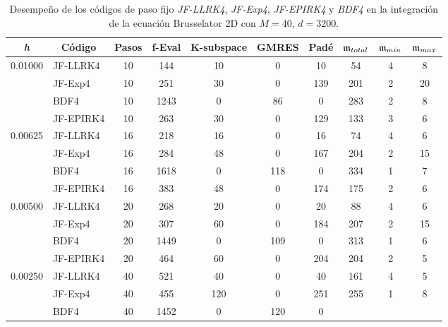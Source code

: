 \begin{table}[htb]
	\caption{Desempeño de los códigos de paso fijo \textit{JF-LLRK4}, \textit{JF-Exp4}, \textit{JF-EPIRK4} y \textit{BDF4} en la integración de la ecuación Brusselator 2D con $M=40$, $d=3200$.}
	\centering
	\begin{adjustbox}{width=0.9\columnwidth,center}
		\begin{tabular}{cccccccccc}
			\hline
			\textit{h} & Código & Pasos & f-Eval & K-subspace & GMRES & Padé & $\mathfrak{m}_{total}$ & $\mf%
			_{min}$ & $\mathfrak{m}_{max}$ \\ \hline
			\multicolumn{1}{l}{0.01000} & \multicolumn{1}{l}{JF-LLRK4} & 10 & 144 & 10
			& 0 & 10 & 54 & 4 & 8 \\
			\multicolumn{1}{l}{} & \multicolumn{1}{l}{JF-Exp4} & 10 & 251 & 30 & 0 & 139
			& 201 & 2 & 20 \\
			\multicolumn{1}{l}{} & \multicolumn{1}{l}{BDF4} & 10 & 1243 & 0 & 86 & 0 &
			283 & 2 & 8 \\
			\multicolumn{1}{l}{} & \multicolumn{1}{l}{JF-EPIRK4} & 10 & 263 & 30 & 0 &
			129 & 133 & 3 & 6 \\
			\multicolumn{1}{l}{0.00625} & \multicolumn{1}{l}{JF-LLRK4} & 16 & 218 & 16
			& 0 & 16 & 74 & 4 & 6 \\
			\multicolumn{1}{l}{} & \multicolumn{1}{l}{JF-Exp4} & 16 & 284 & 48 & 0 & 167
			& 204 & 2 & 15 \\
			\multicolumn{1}{l}{} & \multicolumn{1}{l}{BDF4} & 16 & 1618 & 0 & 118 & 0 &
			334 & 1 & 7 \\
			\multicolumn{1}{l}{} & \multicolumn{1}{l}{JF-EPIRK4} & 16 & 383 & 48 & 0 &
			174 & 175 & 2 & 6 \\
			\multicolumn{1}{l}{0.00500} & \multicolumn{1}{l}{JF-LLRK4} & 20 & 268 & 20 &
			0 & 20 & 88 & 4 & 6 \\
			\multicolumn{1}{l}{} & \multicolumn{1}{l}{JF-Exp4} & 20 & 307 & 60 & 0 & 184
			& 207 & 2 & 15 \\
			\multicolumn{1}{l}{} & \multicolumn{1}{l}{BDF4} & 20 & 1449 & 0 & 109 & 0 &
			313 & 1 & 6 \\
			\multicolumn{1}{l}{} & \multicolumn{1}{l}{JF-EPIRK4} & 20 & 464 & 60 & 0 &
			204 & 204 & 2 & 5 \\
			\multicolumn{1}{l}{0.00250} & \multicolumn{1}{l}{JF-LLRK4} & 40 & 521 & 40 &
			0 & 40 & 161 & 4 & 5 \\
			\multicolumn{1}{l}{} & \multicolumn{1}{l}{JF-Exp4} & 40 & 455 & 120 & 0 & 251
			& 255 & 1 & 8 \\
			\multicolumn{1}{l}{} & \multicolumn{1}{l}{BDF4} & 40 & 1452 & 0 & 120 & 0 &

\end{tabular}
\end{adjustbox}
\end{table}
